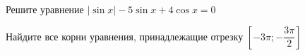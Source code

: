 \begin{ex}
	\begin{condition}
		\begin{enumcols}[label=\asbuk*)]
			\item Решите уравнение \( |\sin x|-5\sin x + 4\cos x = 0 \)
			\item Найдите все корни уравнения, принадлежащие отрезку \( \left[-3\pi;-\dfrac{3\pi}{2}\right] \)
		\end{enumcols}
	\end{condition}
\end{ex}